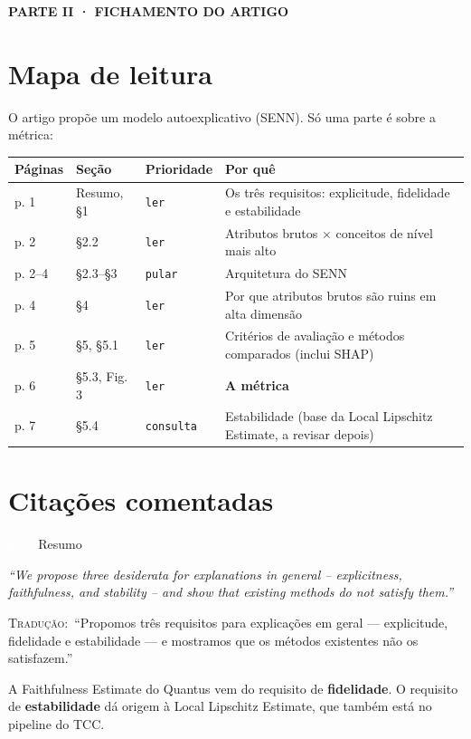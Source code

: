 \documentclass[11pt,a4paper]{article}
\newcommand{\pagechip}[1]{{\setlength{\fboxsep}{1.5pt}\colorbox{cAcc}{\textcolor{white}{\scriptsize\texttt{#1}}}}}
\newcommand{\readtag}[1]{\texttt{\small #1}}
\newcommand{\partbar}[1]{\par\vspace{1.2em}\noindent\colorbox{black!80}{\parbox{\dimexpr\linewidth-2\fboxsep}{\color{white}\bfseries\sffamily\MakeUppercase{#1}}}\par\vspace{0.4em}}
\newenvironment{origquote}{\par\itshape\small}{\par}
\newenvironment{tradquote}{\par\small\textsc{Tradução:}\ }{\par}
\newcommand{\explab}[1]{\par\smallskip{\small\color{cAcc}\textbf{\MakeUppercase{#1}}}\par}
\begin{document}
\partbar{Parte II · Fichamento do artigo}

\section{Mapa de leitura}
O artigo propõe um modelo autoexplicativo (SENN). Só uma parte é sobre a métrica:
\begin{center}\small
\begin{tabularx}{\linewidth}{llll}
\toprule
\textbf{Páginas} & \textbf{Seção} & \textbf{Prioridade} & \textbf{Por quê} \\
\midrule
p. 1 & Resumo, §1 & \readtag{ler} & Os três requisitos: explicitude, fidelidade e estabilidade \\
p. 2 & §2.2 & \readtag{ler} & Atributos brutos × conceitos de nível mais alto \\
p. 2--4 & §2.3--§3 & \readtag{pular} & Arquitetura do SENN \\
p. 4 & §4 & \readtag{ler} & Por que atributos brutos são ruins em alta dimensão \\
p. 5 & §5, §5.1 & \readtag{ler} & Critérios de avaliação e métodos comparados (inclui SHAP) \\
p. 6 & §5.3, Fig. 3 & \readtag{ler} & \textbf{A métrica} \\
p. 7 & §5.4 & \readtag{consulta} & Estabilidade (base da Local Lipschitz Estimate, a revisar depois) \\
\bottomrule
\end{tabularx}
\end{center}

\section{Citações comentadas}

\begin{citacard}{\pagechip{p. 1} Resumo}
\begin{origquote}“We propose three desiderata for explanations in general – explicitness, faithfulness, and stability – and show that existing methods do not satisfy them.”\end{origquote}
\begin{tradquote}“Propomos três requisitos para explicações em geral — explicitude, fidelidade e estabilidade — e mostramos que os métodos existentes não os satisfazem.”\end{tradquote}
\explab{Explicação}
A Faithfulness Estimate do Quantus vem do requisito de \textbf{fidelidade}. O requisito de \textbf{estabilidade} dá origem à Local Lipschitz Estimate, que também está no pipeline do TCC.
\end{citacard}
\end{document}
